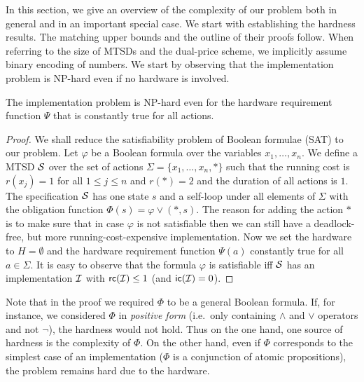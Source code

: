 In this section, we give an overview of the complexity of our problem both 
in general and in an important special case. We start with establishing 
the hardness results. The matching upper bounds and the outline of their 
proofs follow. 
When referring to the size of MTSDs and the dual-price scheme, we
implicitly assume binary encoding of numbers.
We start by observing that the implementation problem is NP-hard even if no hardware is involved.

\begin{proposition}
The implementation problem is NP-hard even for the hardware
requirement function $\Psi$ that is constantly true for all actions.
\end{proposition}
\begin{proof}
We shall reduce the satisfiability problem of Boolean formulae (SAT) 
to our problem. Let $\varphi$ be a Boolean formula over the 
variables $x_1,\ldots,x_n$. We define a MTSD $\mathcal S$ over the set
of actions $\Sigma=\{x_1,\ldots,x_n,*\}$ such that the running cost is 
$r(x_j)= 1$ for all $1\leq j\leq n$ and $r(*)=2$ and the duration of all actions is $1$.  
The specification $\mathcal S$ has 
one state $s$ and a self-loop under all elements of $\Sigma$ with
the obligation function $\Phi(s)=\varphi\vee (*,s)$. The reason for adding
the action $*$ is to make sure that in case $\varphi$ is not satisfiable
then we can still have a deadlock-free, but more running-cost-expensive implementation. 
Now we set the hardware to $H=\emptyset$ and the hardware requirement
function $\Psi(a)$ constantly true for all $a \in \Sigma$. 
It is easy to observe that the formula $\varphi$ is satisfiable iff $\mathcal S$ 
has an implementation $\mathcal I$ with $\mathsf{rc}(\mathcal I)\leq 1$ (and $\mathsf{ic}(\mathcal I)=0$).
\end{proof}

Note that in the proof we required $\Phi$ to be a general Boolean formula. 
If, for instance, we considered $\Phi$ in \emph{positive form}
(i.e.~only containing $\wedge$ and $\vee$ operators and not $\neg$), 
the hardness would not hold.
Thus on the one hand, one source of hardness is the complexity of $\Phi$. 
On the other hand, even if $\Phi$ corresponds to the simplest case of an 
implementation ($\Phi$ is a conjunction of atomic propositions), the problem 
remains hard due to the hardware.


